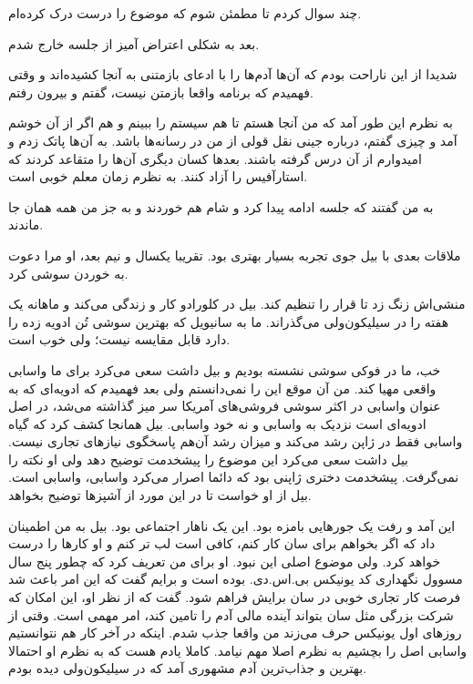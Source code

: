 چند سوال کردم تا مطمئن شوم که موضوع را درست درک کرده‌ام. 

بعد به شکلی اعتراض آمیز از جلسه خارج شدم. 

شدیدا از این ناراحت بودم که آن‌ها آدم‌ها را با ادعای بازمتنی به آنجا
کشیده‌اند و وقتی فهمیدم که برنامه واقعا بازمتن نیست، گفتم  و بیرون رفتم.

به نظرم این طور آمد که من آنجا هستم تا هم سیستم را ببینم و هم اگر از
آن خوشم آمد و چیزی گفتم، درباره جینی نقل قولی از من در رسانه‌ها
باشد. به آن‌ها پاتک زدم و امیدوارم از آن درس گرفته باشند. بعدها کسان
دیگری آن‌ها را متقاعد کردند که استارآفیس را آزاد کنند. به نظرم زمان
معلم خوبی است.

به من گفتند که جلسه ادامه پیدا کرد و شام هم خوردند و به جز من همه همان
جا ماندند.

ملاقات بعدی با بیل جوی تجربه بسیار بهتری بود. تقریبا یکسال و نیم بعد،
او مرا دعوت به خوردن سوشی کرد.

منشی‌اش زنگ زد تا قرار را تنظیم کند. بیل در کلورادو کار و زندگی می‌کند و
ماهانه یک هفته را در سیلیکون‌ولی می‌گذراند. ما به سانیویل که بهترین سوشی تُن ادویه زده را دارد قابل مقایسه نیست؛ ولی
خوب است.

خب، ما در فوکی سوشی نشسته بودیم و بیل داشت سعی‌ می‌کرد برای ما
واسابی واقعی مهیا کند. من آن موقع این را نمی‌دانستم ولی بعد
فهمیدم که ادویه‌ای که به عنوان واسابی در اکثر سوشی فروشی‌های آمریکا سر
میز گذاشته می‌شد،‌ در اصل ادویه‌ای است نزدیک به واسابی و نه خود
واسابی. بیل همانجا کشف کرد که گیاه واسابی فقط در ژاپن رشد می‌کند و
میزان رشد آن‌هم پاسخگوی نیازهای تجاری نیست. بیل داشت سعی می‌کرد این
موضوع را پیشخدمت توضیح دهد ولی او نکته را نمی‌گرفت. پیشخدمت دختری ژاپنی
بود که دائما اصرار می‌کرد واسابی، واسابی است. بیل از او خواست تا در این
مورد از آشپزها توضیح بخواهد.

این آمد و رفت یک جورهایی بامزه بود. این یک ناهار اجتماعی بود. بیل به
من اطمینان داد که اگر بخواهم برای سان کار کنم، کافی است لب تر کنم و او
کارها را درست خواهد کرد. ولی موضوع اصلی این نبود. او برای من تعریف کرد
که چطور پنج سال مسوول نگهداری کد یونیکس بی‌.اس.دی. بوده است و برایم گفت
که این امر باعث شد فرصت کار تجاری خوبی در سان برایش فراهم شود. گفت که
از نظر او، این امکان که شرکت بزرگی مثل سان بتواند آینده مالی آدم را
تامین کند، امر مهمی است. وقتی از روزهای اول یونیکس حرف می‌زند من واقعا
جذب شدم. اینکه در آخر کار هم نتوانستیم واسابی اصل را بچشیم به نظرم اصلا
مهم نیامد. کاملا یادم هست که به نظرم او احتمالا بهترین و جذاب‌ترین آدم
مشهوری آمد که در سیلیکون‌ولی دیده بودم.


